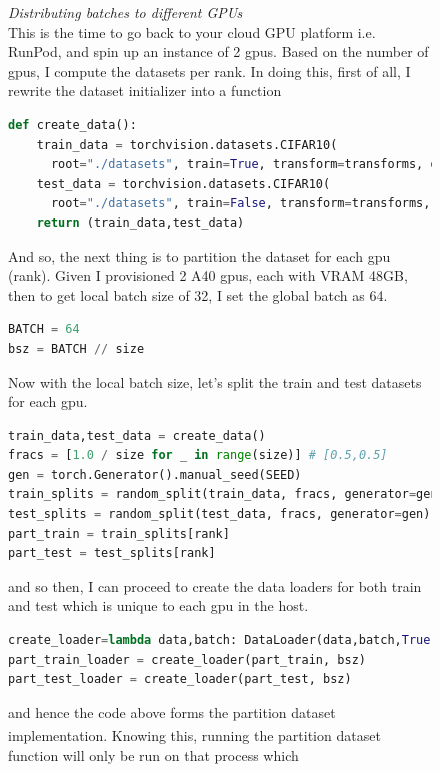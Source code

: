 \documentclass[12pt]{article}
\newcommand{\customtext}[3]{%
    \vspace{#2} %
    \fontsize{13}{8}\textcolor{#1}{\textit{#3}}%
}
\newcommand{\sidecite}[1]{\textsuperscript{\textcolor{blue}{\textbf{\scriptsize#1}}}}
\newcommand{\maincitecount}{\sidecite{\stepcounter{maincite}\themaincite}}
\begin{document}
\begin{figure}[!htb]
    \begin{minipage}[t]{0.65\textwidth}
    \customtext{xtitle}{0em}{Distributing batches to different GPUs}\\
    This is the time to go back to your cloud GPU platform i.e. RunPod, and spin up 
    an instance of 2 gpus. Based on the number of gpus, I compute the datasets per rank.
    In doing this, first of all, I rewrite the dataset initializer into a function 
\begin{lstlisting}[language=python,style=python,basicstyle=\ttfamily\scriptsize]
def create_data():
    train_data = torchvision.datasets.CIFAR10(
      root="./datasets", train=True, transform=transforms, download=True)
    test_data = torchvision.datasets.CIFAR10(
      root="./datasets", train=False, transform=transforms, download=True) 
    return (train_data,test_data)
\end{lstlisting}
And so, the next thing is to partition the dataset for each gpu (rank). Given I provisioned 
2 A40 gpus, each with VRAM {48GB}, then to get local batch size of 32, I set the global batch 
as 64.
\begin{lstlisting}[language=python,style=python,basicstyle=\ttfamily\scriptsize]
BATCH = 64
bsz = BATCH // size
\end{lstlisting}
 Now with the local batch size, let's split the train and test datasets for each gpu.
\begin{lstlisting}[language=python,style=python,basicstyle=\ttfamily\scriptsize]
train_data,test_data = create_data()
fracs = [1.0 / size for _ in range(size)] # [0.5,0.5]
gen = torch.Generator().manual_seed(SEED)
train_splits = random_split(train_data, fracs, generator=gen)
test_splits = random_split(test_data, fracs, generator=gen)
part_train = train_splits[rank]
part_test = test_splits[rank]
\end{lstlisting}
and so then, I can proceed to create the data loaders for both train and test which 
is unique to each gpu in the host.
\begin{lstlisting}[language=python,style=python,basicstyle=\ttfamily\scriptsize]
create_loader=lambda data,batch: DataLoader(data,batch,True)
part_train_loader = create_loader(part_train, bsz)
part_test_loader = create_loader(part_test, bsz)
\end{lstlisting}
and hence the code above forms the partition dataset implementation\maincitecount.
Knowing this, running the partition dataset function will only be run on that process which 

\end{minipage}
\end{figure}
\end{document}
